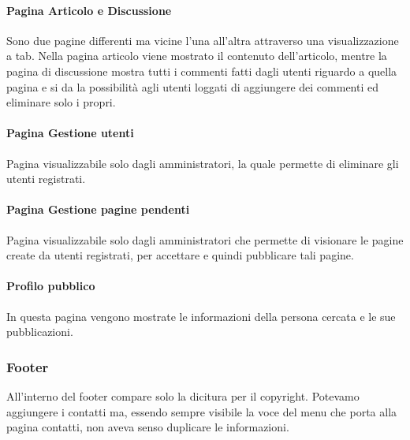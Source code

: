 \paragraph{Pagina Articolo e Discussione} Sono due pagine differenti ma vicine l'una all'altra attraverso una visualizzazione a tab. Nella pagina articolo viene mostrato il contenuto dell'articolo, mentre la pagina di discussione mostra tutti i commenti fatti dagli utenti riguardo a quella pagina e si da la possibilità agli utenti loggati di aggiungere dei commenti ed eliminare solo i propri.

\paragraph{Pagina Gestione utenti} Pagina visualizzabile solo dagli amministratori, la quale permette di eliminare gli utenti registrati.

\paragraph{Pagina Gestione pagine pendenti} Pagina visualizzabile solo dagli amministratori che permette di visionare le pagine create da utenti registrati, per accettare e quindi pubblicare tali pagine.

\paragraph{Profilo pubblico} In questa pagina vengono mostrate le informazioni della persona cercata e le sue pubblicazioni.

\subsubsection{Footer}
All'interno del footer compare solo la dicitura per il copyright. Potevamo aggiungere i contatti ma, essendo sempre visibile la voce del menu che porta alla pagina contatti, non aveva senso duplicare le informazioni.

\pagebreak

